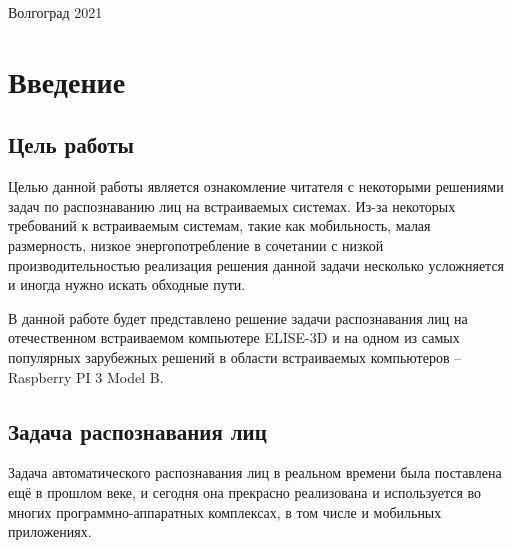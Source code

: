 \documentclass[14pt,a4paper]{scrartcl}
\begin{document}
\begin{titlepage}
	\vfill
	
	\begin{center}
	  Волгоград 2021
	\end{center}

\end{titlepage}

\tableofcontents
\newpage

\section{Введение}

	\subsection{Цель работы}
	
		Целью данной работы является ознакомление читателя с некоторыми решениями задач по распознаванию лиц на встраиваемых системах. Из-за некоторых требований к встраиваемым системам, такие как мобильность, малая размерность, низкое энергопотребление в сочетании с низкой производительностью реализация решения данной задачи несколько усложняется и иногда нужно искать обходные пути. 
		
		В данной работе будет представлено решение задачи распознавания лиц на отечественном встраиваемом компьютере ELISE-3D и на одном из самых популярных зарубежных решений в области встраиваемых компьютеров – Raspberry PI 3 Model B.

	
		
		\subsection{Задача распознавания лиц}
		
			Задача автоматического распознавания лиц в реальном времени была поставлена ещё в прошлом веке, и сегодня она прекрасно реализована и используется во многих программно-аппаратных комплексах, в том числе и мобильных приложениях.
			
\end{document}
